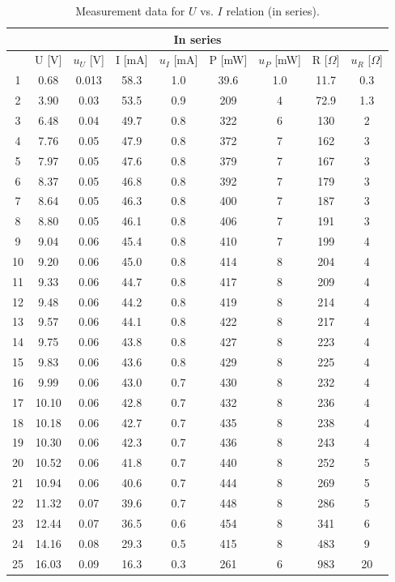\documentclass[a4paper,12pt]{article}
\begin{document}
\begin{table}[H]
\begin{center}
\begin{tabular}{|c|c|c|c|c|c|c|c|c|}
\hline
\multicolumn{9}{|c|}{In series} \\ \hline
 & U {[}V{]} & $u_U$ {[}V{]} & I {[}mA{]} & $u_I$ {[}mA{]} & P {[}mW{]} & $u_P$ {[}mW{]} & R {[}$\Omega${]} & $u_R$ {[}$\Omega${]} \\ \hline
1 & 0.68 & 0.013 & 58.3 & 1.0 & 39.6 & 1.0 & 11.7 & 0.3 \\ \hline
2 & 3.90 & 0.03 & 53.5 & 0.9 & 209 & 4 & 72.9 & 1.3 \\ \hline
3 & 6.48 & 0.04 & 49.7 & 0.8 & 322 & 6 & 130 & 2 \\ \hline
4 & 7.76 & 0.05 & 47.9 & 0.8 & 372 & 7 & 162 & 3 \\ \hline
5 & 7.97 & 0.05 & 47.6 & 0.8 & 379 & 7 & 167 & 3 \\ \hline
6 & 8.37 & 0.05 & 46.8 & 0.8 & 392 & 7 & 179 & 3 \\ \hline
7 & 8.64 & 0.05 & 46.3 & 0.8 & 400 & 7 & 187 & 3 \\ \hline
8 & 8.80 & 0.05 & 46.1 & 0.8 & 406 & 7 & 191 & 3 \\ \hline
9 & 9.04 & 0.06 & 45.4 & 0.8 & 410 & 7 & 199 & 4 \\ \hline
10 & 9.20 & 0.06 & 45.0 & 0.8 & 414 & 8 & 204 & 4 \\ \hline
11 & 9.33 & 0.06 & 44.7 & 0.8 & 417 & 8 & 209 & 4 \\ \hline
12 & 9.48 & 0.06 & 44.2 & 0.8 & 419 & 8 & 214 & 4 \\ \hline
13 & 9.57 & 0.06 & 44.1 & 0.8 & 422 & 8 & 217 & 4 \\ \hline
14 & 9.75 & 0.06 & 43.8 & 0.8 & 427 & 8 & 223 & 4 \\ \hline
15 & 9.83 & 0.06 & 43.6 & 0.8 & 429 & 8 & 225 & 4 \\ \hline
16 & 9.99 & 0.06 & 43.0 & 0.7 & 430 & 8 & 232 & 4 \\ \hline
17 & 10.10 & 0.06 & 42.8 & 0.7 & 432 & 8 & 236 & 4 \\ \hline
18 & 10.18 & 0.06 & 42.7 & 0.7 & 435 & 8 & 238 & 4 \\ \hline
19 & 10.30 & 0.06 & 42.3 & 0.7 & 436 & 8 & 243 & 4 \\ \hline
20 & 10.52 & 0.06 & 41.8 & 0.7 & 440 & 8 & 252 & 5 \\ \hline
21 & 10.94 & 0.06 & 40.6 & 0.7 & 444 & 8 & 269 & 5 \\ \hline
22 & 11.32 & 0.07 & 39.6 & 0.7 & 448 & 8 & 286 & 5 \\ \hline
23 & 12.44 & 0.07 & 36.5 & 0.6 & 454 & 8 & 341 & 6 \\ \hline
24 & 14.16 & 0.08 & 29.3 & 0.5 & 415 & 8 & 483 & 9 \\ \hline
25 & 16.03 & 0.09 & 16.3 & 0.3 & 261 & 6 & 983 & 20 \\ \hline
\end{tabular}
\caption{Measurement data for $U$ vs. $I$ relation (in series).}
\end{center}
\end{table}
\end{document}

